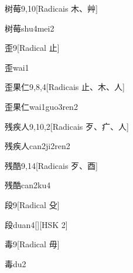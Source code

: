 \begin{entry}{树莓}{9,10}[Radicais ⽊、⾋]
  \begin{phonetics}{树莓}{shu4mei2}
  \end{phonetics}
\end{entry}

\begin{entry}{歪}{9}[Radical ⽌]
  \begin{phonetics}{歪}{wai1}
  \end{phonetics}
\end{entry}

\begin{entry}{歪果仁}{9,8,4}[Radicais ⽌、⽊、⼈]
  \begin{phonetics}{歪果仁}{wai1guo3ren2}
  \end{phonetics}
\end{entry}

\begin{entry}{残疾人}{9,10,2}[Radicais ⽍、⽧、⼈]
  \begin{phonetics}{残疾人}{can2ji2ren2}
  \end{phonetics}
\end{entry}

\begin{entry}{残酷}{9,14}[Radicais ⽍、⾣]
  \begin{phonetics}{残酷}{can2ku4}
  \end{phonetics}
\end{entry}

\begin{entry}{段}{9}[Radical ⽎]
  \begin{phonetics}{段}{duan4}[][HSK 2]
  \end{phonetics}
\end{entry}

\begin{entry}{毒}{9}[Radical ⽏]
  \begin{phonetics}{毒}{du2}
  \end{phonetics}
\end{entry}

